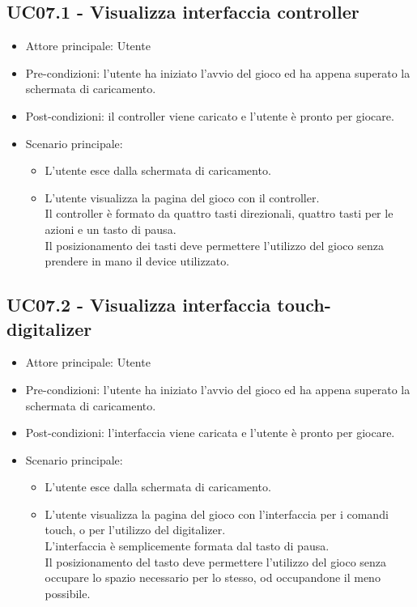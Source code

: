 \subsection{UC07.1 - Visualizza interfaccia controller}
\begin{itemize}
    \item Attore principale: Utente
    \item Pre-condizioni: l'utente ha iniziato l'avvio del gioco ed ha appena superato la schermata di caricamento.
    \item Post-condizioni: il controller viene caricato e l'utente è pronto per giocare.
    \item Scenario principale: \begin{itemize}
        \item L'utente esce dalla schermata di caricamento.
        \item L'utente visualizza la pagina del gioco con il controller.\\ Il controller è formato da quattro tasti direzionali, quattro tasti per le azioni e un tasto di pausa.\\ Il posizionamento dei tasti deve permettere l'utilizzo del gioco senza prendere in mano il device utilizzato.
    \end{itemize}
\end{itemize}

\subsection{UC07.2 - Visualizza interfaccia touch-digitalizer}
\begin{itemize}
    \item Attore principale: Utente
    \item Pre-condizioni: l'utente ha iniziato l'avvio del gioco ed ha appena superato la schermata di caricamento.
    \item Post-condizioni: l'interfaccia viene caricata e l'utente è pronto per giocare.
    \item Scenario principale: \begin{itemize}
        \item L'utente esce dalla schermata di caricamento.
        \item L'utente visualizza la pagina del gioco con l'interfaccia per i comandi touch, o per l'utilizzo del digitalizer.\\ L'interfaccia è semplicemente formata dal tasto di pausa.\\ Il posizionamento del tasto deve permettere l'utilizzo del gioco senza occupare lo spazio necessario per lo stesso, od occupandone il meno possibile.
    \end{itemize}
\end{itemize}
\newpage
